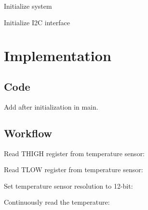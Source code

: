 \begin{DoxyEnumerate}
\item Initialize system 
\begin{DoxyCodeInclude}{0}
\end{DoxyCodeInclude}

\item Initialize I2C interface 
\begin{DoxyCodeInclude}{0}
\end{DoxyCodeInclude}
 
\end{DoxyEnumerate}\hypertarget{asfdoc_sam0_at30tse75x_qs_asfdoc_sam0_at30tse75x_qs_implement}{}\section{Implementation}\label{asfdoc_sam0_at30tse75x_qs_asfdoc_sam0_at30tse75x_qs_implement}
\hypertarget{asfdoc_sam0_at30tse75x_qs_asfdoc_sam0_at30tse75x_qs_imp_code}{}\subsection{Code}\label{asfdoc_sam0_at30tse75x_qs_asfdoc_sam0_at30tse75x_qs_imp_code}
Add after initialization in main. 
\begin{DoxyCodeInclude}{0}
\end{DoxyCodeInclude}
 \hypertarget{asfdoc_sam0_at30tse75x_qs_asfdoc_sam0_at30tse75x_qs_imp_workflow}{}\subsection{Workflow}\label{asfdoc_sam0_at30tse75x_qs_asfdoc_sam0_at30tse75x_qs_imp_workflow}

\begin{DoxyEnumerate}
\item Read T\+H\+I\+GH register from temperature sensor\+: 
\begin{DoxyCodeInclude}{0}
\end{DoxyCodeInclude}

\item Read T\+L\+OW register from temperature sensor\+: 
\begin{DoxyCodeInclude}{0}
\end{DoxyCodeInclude}

\item Set temperature sensor resolution to 12-\/bit\+: 
\begin{DoxyCodeInclude}{0}
\end{DoxyCodeInclude}

\item Continuously read the temperature\+: 
\begin{DoxyCodeInclude}{0}
\end{DoxyCodeInclude}

\end{DoxyEnumerate}